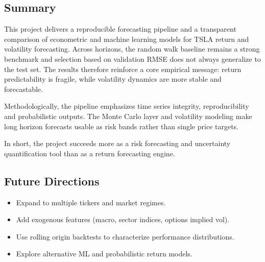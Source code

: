 \documentclass[11pt,a4paper]{article}
\begin{document}
\subsection{Summary}
\begingroup
\setlength{\parskip}{0.5\baselineskip}
\setlength{\parindent}{1.25em}
\hspace*{\parindent}This project delivers a reproducible forecasting pipeline and a transparent comparison of econometric and machine learning models for TSLA return and volatility forecasting. Across horizons, the random walk baseline remains a strong benchmark and selection based on validation RMSE does not always generalize to the test set. The results therefore reinforce a core empirical message: return predictability is fragile, while volatility dynamics are more stable and forecastable.

\noindent Methodologically, the pipeline emphasizes time series integrity, reproducibility and probabilistic outputs. The Monte Carlo layer and volatility modeling make long horizon forecasts usable as risk bands rather than single price targets.

\noindent In short, the project succeeds more as a risk forecasting and uncertainty quantification tool than as a return forecasting engine.
\endgroup

\subsection{Future Directions}
\begin{itemize}
\setlength{\itemsep}{0pt}
\setlength{\topsep}{0pt}
\setlength{\parskip}{0pt}
\setlength{\partopsep}{0pt}
    \item Expand to multiple tickers and market regimes.
    \item Add exogenous features (macro, sector indices, options implied vol).
    \item Use rolling origin backtests to characterize performance distributions.
    \item Explore alternative ML and probabilistic return models.
\end{itemize}

\newpage
\setlength{\bibitemsep}{0.5\baselineskip}
\printbibliography

\newpage
\appendix
\renewcommand{\thetable}{A.\arabic{table}}
\renewcommand{\thefigure}{A.\arabic{figure}}
\setcounter{table}{0}
\setcounter{figure}{0}
\end{document}
